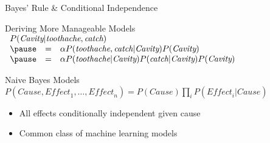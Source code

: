 \documentclass[14pt]{beamer}
\begin{document}
\begin{frame}{Bayes' Rule \& Conditional Independence}
	\begin{block}{Deriving More Manageable Models}
		$
		\begin{array}{lll}
		\lefteqn{P(\textit{Cavity}|\textit{toothache}, \textit{catch})} \\
		\pause
		& = & \alpha\displaystyle P(\textit{toothache}, \textit{catch}|\textit{Cavity})
		                          P(\textit{Cavity}) \\
		\pause
		& = & \alpha\displaystyle P(\textit{toothache}|\textit{Cavity})
		                          P(\textit{catch}|\textit{Cavity})
		                          P(\textit{Cavity}) \\
		\end{array}
		$
	\end{block}
	\pause
	\begin{block}{Naive Bayes Models}
		\small
		$
		P(\textit{Cause},\textit{Effect}_{1},\ldots,\textit{Effect}_{n})
		 = P(\textit{Cause})\prod_{i}{P(\textit{Effect}_{i}|\textit{Cause})}
		$
		\normalsize
		\begin{itemize}
			\item All effects conditionally independent given cause
			\item Common class of machine learning models
		\end{itemize}
	\end{block}
\end{frame}
\end{document}
